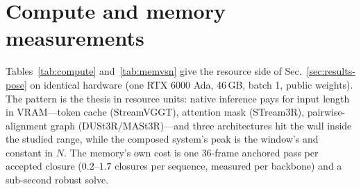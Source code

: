 \section{Compute and memory measurements}
\label{app:compute}
Tables~\ref{tab:compute} and~\ref{tab:memvsn} give the resource side of
Sec.~\ref{sec:results-pose} on identical hardware (one RTX 6000 Ada, 46\,GB,
batch 1, public weights). The pattern is the thesis in resource units: native
inference pays for input length in VRAM---token cache (StreamVGGT), attention
mask (STream3R), pairwise-alignment graph (DUSt3R/MASt3R)---and three
architectures hit the wall inside the studied range, while the composed
system's peak is the window's and constant in $N$. The memory's own cost is
one $36$-frame anchored pass per accepted closure ($0.2$--$1.7$ closures per
sequence, measured per backbone) and a sub-second robust solve.

